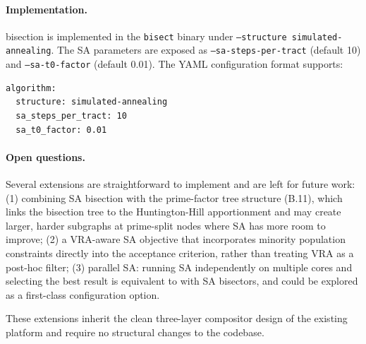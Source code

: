 \paragraph{Implementation.}
\sa{} bisection is implemented in the \texttt{bisect} binary under
\texttt{--structure simulated-annealing}.
The SA parameters are exposed as \texttt{--sa-steps-per-tract} (default 10)
and \texttt{--sa-t0-factor} (default 0.01).
The YAML configuration format supports:
\begin{verbatim}
algorithm:
  structure: simulated-annealing
  sa_steps_per_tract: 10
  sa_t0_factor: 0.01
\end{verbatim}

\paragraph{Open questions.}
Several extensions are straightforward to implement and are left for future work:
(1) combining SA bisection with the \ar{} prime-factor tree structure (B.11),
    which links the bisection tree to the Huntington-Hill apportionment and
    may create larger, harder subgraphs at prime-split nodes where SA has
    more room to improve;
(2) a VRA-aware SA objective that incorporates minority population constraints
    directly into the acceptance criterion, rather than treating VRA as a
    post-hoc filter;
(3) parallel SA: running SA independently on multiple cores and selecting the
    best result is equivalent to \be{} with SA bisectors, and could be
    explored as a first-class configuration option.

These extensions inherit the clean three-layer compositor design of the
existing platform and require no structural changes to the codebase.
